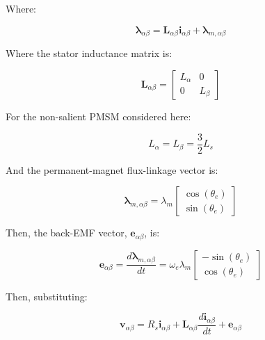 \documentclass{article}
\begin{document}
Where:

\begin{equation}
    \boldsymbol{\lambda}_{\alpha\beta} = \mathbf{L}_{\alpha\beta}\mathbf{i}_{\alpha\beta} + \boldsymbol{\lambda}_{m,\alpha\beta}
\end{equation}

Where the stator inductance matrix is:

\begin{equation}
\label{eqn-alpha-beta-inductance-matrix}
    \mathbf{L}_{\alpha\beta}
    =
    \begin{bmatrix}
        L_\alpha & 0 \\
        0 & L_\beta
    \end{bmatrix}
\end{equation}

For the non-salient PMSM considered here:

\begin{equation}
\label{eqn-Lalpha-Lbeta}
    L_\alpha=L_\beta=\frac{3}{2}L_s
\end{equation}

And the permanent-magnet flux-linkage vector is:

\begin{equation}
\label{eqn-alpha-beta-pm-flux}
    \boldsymbol{\lambda}_{m,\alpha\beta}
    =
    \lambda_m
    \begin{bmatrix}
        \cos(\theta_e) \\
        \sin(\theta_e)
    \end{bmatrix}
\end{equation}

Then, the back-EMF vector, $\mathbf{e}_{\alpha\beta}$, is:

\begin{equation}
    \mathbf{e}_{\alpha\beta}
    =
    \frac{d\boldsymbol{\lambda}_{m,\alpha\beta}}{dt}
    =
    \omega_e\lambda_m
    \begin{bmatrix}
        -\sin(\theta_e) \\
        \cos(\theta_e)
    \end{bmatrix}
\end{equation}

Then, substituting:

\begin{equation}
    \mathbf{v}_{\alpha\beta}
    =
    R_s\mathbf{i}_{\alpha\beta}
    +
    \mathbf{L}_{\alpha\beta}
    \frac{d\mathbf{i}_{\alpha\beta}}{dt}
    +
    \mathbf{e}_{\alpha\beta}
\end{equation}
\end{document}
